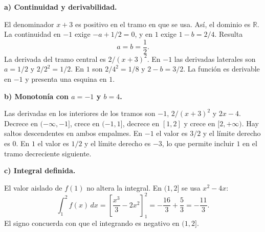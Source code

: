 \textbf{a) Continuidad y derivabilidad.}\par\nopagebreak[4]
El denominador $x+3$ es positivo en el tramo en que se usa. Así, el dominio es $\mathbb R$. La continuidad en $-1$ exige $-a+1/2=0$, y en $1$ exige $1-b=2/4$. Resulta
\[
\boxed{a=b=\frac12}.
\]
La derivada del tramo central es $2/(x+3)^2$. En $-1$ las derivadas laterales son $a=1/2$ y $2/2^2=1/2$. En $1$ son $2/4^2=1/8$ y $2-b=3/2$. La función es derivable en $-1$ y presenta una esquina en $1$.

\textbf{b) Monotonía con $a=-1$ y $b=4$.}\par\nopagebreak[4]
Las derivadas en los interiores de los tramos son $-1$, $2/(x+3)^2$ y $2x-4$. Decrece en $(-\infty,-1]$, crece en $(-1,1]$, decrece en $[1,2]$ y crece en $[2,+\infty)$. Hay saltos descendentes en ambos empalmes. En $-1$ el valor es $3/2$ y el límite derecho es $0$. En $1$ el valor es $1/2$ y el límite derecho es $-3$, lo que permite incluir $1$ en el tramo decreciente siguiente.

\textbf{c) Integral definida.}\par\nopagebreak[4]
El valor aislado de $f(1)$ no altera la integral. En $(1,2]$ se usa $x^2-4x$:
\[
\int_1^2 f(x)\,dx=\left[\frac{x^3}{3}-2x^2\right]_1^2
=-\frac{16}{3}+\frac53=\boxed{-\frac{11}{3}}.
\]
El signo concuerda con que el integrando es negativo en $(1,2]$.
